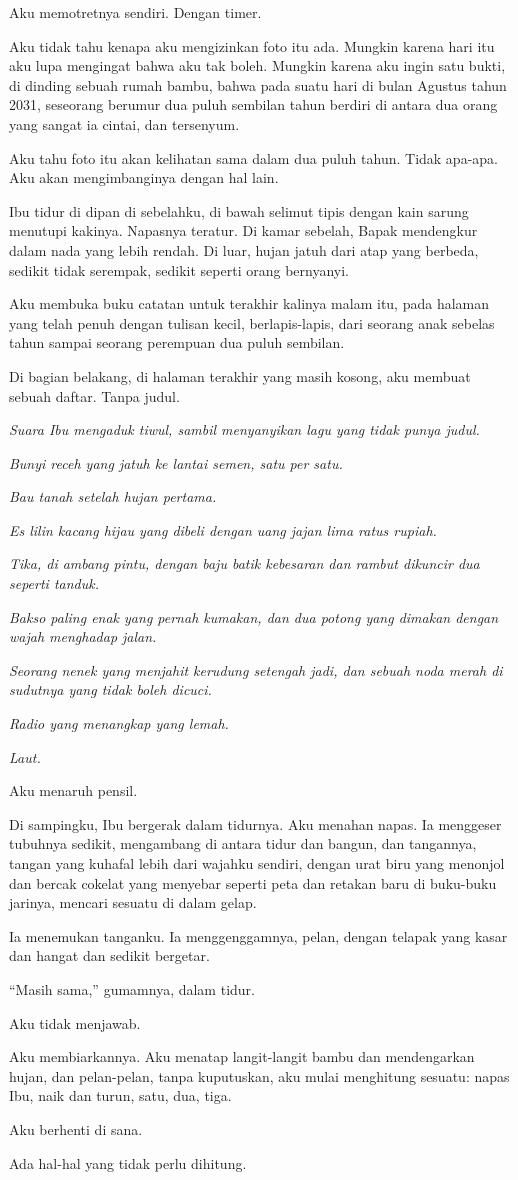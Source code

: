 \documentclass[11pt,twoside,openany]{book}
\begin{document}
Aku memotretnya sendiri. Dengan timer.

Aku tidak tahu kenapa aku mengizinkan foto itu ada. Mungkin karena hari itu aku lupa mengingat bahwa aku tak boleh. Mungkin karena aku ingin satu bukti, di dinding sebuah rumah bambu, bahwa pada suatu hari di bulan Agustus tahun 2031, seseorang berumur dua puluh sembilan tahun berdiri di antara dua orang yang sangat ia cintai, dan tersenyum.

Aku tahu foto itu akan kelihatan sama dalam dua puluh tahun. Tidak apa-apa. Aku akan mengimbanginya dengan hal lain.

Ibu tidur di dipan di sebelahku, di bawah selimut tipis dengan kain sarung menutupi kakinya. Napasnya teratur. Di kamar sebelah, Bapak mendengkur dalam nada yang lebih rendah. Di luar, hujan jatuh dari atap yang berbeda, sedikit tidak serempak, sedikit seperti orang bernyanyi.

Aku membuka buku catatan untuk terakhir kalinya malam itu, pada halaman yang telah penuh dengan tulisan kecil, berlapis-lapis, dari seorang anak sebelas tahun sampai seorang perempuan dua puluh sembilan.

Di bagian belakang, di halaman terakhir yang masih kosong, aku membuat sebuah daftar. Tanpa judul.

\emph{Suara Ibu mengaduk tiwul, sambil menyanyikan lagu yang tidak punya judul.}

\emph{Bunyi receh yang jatuh ke lantai semen, satu per satu.}

\emph{Bau tanah setelah hujan pertama.}

\emph{Es lilin kacang hijau yang dibeli dengan uang jajan lima ratus rupiah.}

\emph{Tika, di ambang pintu, dengan baju batik kebesaran dan rambut dikuncir dua seperti tanduk.}

\emph{Bakso paling enak yang pernah kumakan, dan dua potong yang dimakan dengan wajah menghadap jalan.}

\emph{Seorang nenek yang menjahit kerudung setengah jadi, dan sebuah noda merah di sudutnya yang tidak boleh dicuci.}

\emph{Radio yang menangkap yang lemah.}

\emph{Laut.}

Aku menaruh pensil.

Di sampingku, Ibu bergerak dalam tidurnya. Aku menahan napas. Ia menggeser tubuhnya sedikit, mengambang di antara tidur dan bangun, dan tangannya, tangan yang kuhafal lebih dari wajahku sendiri, dengan urat biru yang menonjol dan bercak cokelat yang menyebar seperti peta dan retakan baru di buku-buku jarinya, mencari sesuatu di dalam gelap.

Ia menemukan tanganku. Ia menggenggamnya, pelan, dengan telapak yang kasar dan hangat dan sedikit bergetar.

``Masih sama,'' gumamnya, dalam tidur.

Aku tidak menjawab.

Aku membiarkannya. Aku menatap langit-langit bambu dan mendengarkan hujan, dan pelan-pelan, tanpa kuputuskan, aku mulai menghitung sesuatu: napas Ibu, naik dan turun, satu, dua, tiga.

Aku berhenti di sana.

Ada hal-hal yang tidak perlu dihitung.
\end{document}
